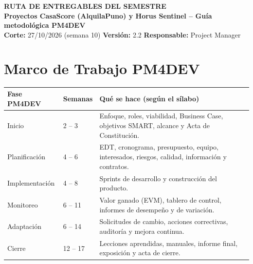 \documentclass[11pt,a4paper]{article}
\begin{document}

\begin{center}
    {\Large \textbf{\textcolor{AzulUNA}{RUTA DE ENTREGABLES DEL SEMESTRE}}}\\[3pt]
    {\normalsize \textbf{Proyectos CasaScore (AlquilaPuno) y Horus Sentinel -- Guía metodológica PM4DEV}}\\[4pt]
    \footnotesize \textbf{Corte:} 27/10/2026 (semana 10) \quad \textbar\quad \textbf{Versión:} 2.2 \quad \textbar\quad \textbf{Responsable:} Project Manager
\end{center}

\vspace{0.1cm}


\section{Marco de Trabajo PM4DEV}

\vspace{0.1cm}
{\small
\noindent\begin{tabularx}{\textwidth}{@{}P{2.9cm} C{2.0cm} L@{}}
\toprule
{}
\textbf{Fase PM4DEV} & \textbf{Semanas} & \textbf{Qué se hace (según el sílabo)} \\
\midrule
Inicio & 2 -- 3 & Enfoque, roles, viabilidad, Business Case, objetivos SMART, alcance y Acta de Constitución. \\
Planificación & 4 -- 6 & EDT, cronograma, presupuesto, equipo, interesados, riesgos, calidad, información y contratos. \\
Implementación & 4 -- 8 & Sprints de desarrollo y construcción del producto. \\
Monitoreo & 6 -- 11 & Valor ganado (EVM), tablero de control, informes de desempeño y de variación. \\
Adaptación & 6 -- 14 & Solicitudes de cambio, acciones correctivas, auditoría y mejora continua. \\
Cierre & 12 -- 17 & Lecciones aprendidas, manuales, informe final, exposición y acta de cierre. \\
\bottomrule
\end{tabularx}
}
\end{document}
